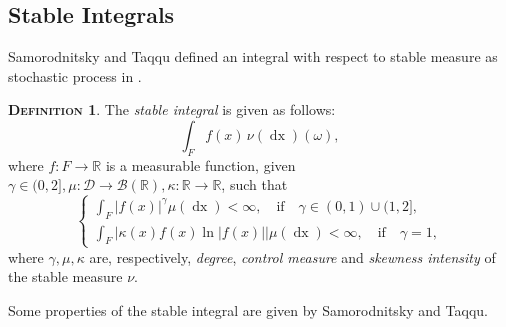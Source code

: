 \documentclass[a4paper, twoside, 11pt]{article}
\theoremstyle{definition}
\newtheorem{definition}{\scshape Definition}[section]
\begin{document}
  \subsection{Stable Integrals}
  Samorodnitsky and Taqqu defined an integral with respect to stable measure as stochastic process in \cite{samorodnitsky}. 
  \begin{definition}
	The \emph{stable integral} is given as follows:
  \begin{equation}
	\int_F f(x)\, \nu(\mathop{dx}) (\omega),
	\label{sec:stbint}
  \end{equation}
  where $f : F \rightarrow \mathbb{R}$ is a measurable function, given $\gamma\in (0, 2], \mu : \mathscr{D}\rightarrow \mathscr{B}(\mathbb{R}), \kappa: \mathbb{R}\rightarrow \mathbb{R}$, such that 
  \begin{equation}
  \begin{cases} \int_F |f(x)|^\gamma \mu(\mathop{dx}) < \infty,\hspace{1em} \text{if} \hspace{1em} \gamma \in (0, 1) \cup (1, 2],\\
	  \int_F |\kappa(x) f(x) \ln|f(x)||\mu(\mathop{dx}) < \infty,\hspace{1em} \text{if} \hspace{1em} \gamma = 1,
	\end{cases}
  \end{equation}
  where $\gamma, \mu , \kappa$ are, respectively, \emph{degree}, \emph{control measure} and \emph{skewness intensity} of the stable measure $\nu$.
  \end{definition}
  Some properties of the stable integral are given by Samorodnitsky and Taqqu.
\end{document}
